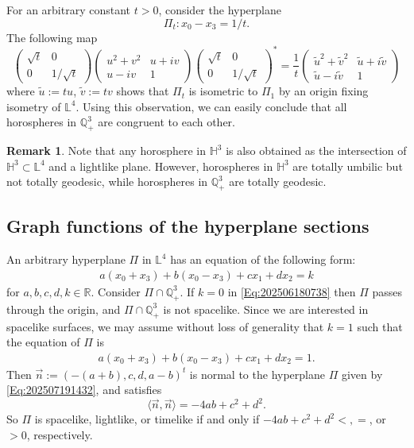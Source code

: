 \documentclass[12pt,reqno]{amsart}
\theoremstyle{plain} %
\theoremstyle{definition}
\newtheorem{remark}[theorem]{Remark}
\numberwithin{equation}{section}
\newcommand{\qthreep}{\mathbb{Q}^3_+}
\begin{document}
For an arbitrary constant $t>0$, consider the hyperplane
\begin{equation}\label{Eq:202601260727PM}
	\Pi_t : x_0 - x_3 = 1/t.
\end{equation}
The following map
$$
	\begin{pmatrix} \sqrt{t} & 0 \\ 0 & 1/\sqrt{t} \end{pmatrix}
	\begin{pmatrix} u^2 + v^2 & u + i v \\ u - i v & 1 \end{pmatrix}
	\begin{pmatrix} \sqrt{t} & 0 \\ 0 & 1/\sqrt{t} \end{pmatrix}^*
	= \frac{1}{t} \begin{pmatrix} \tilde{u}^2 + \tilde{v}^2 & \tilde{u} + i \tilde{v} \\ \tilde{u}  - i \tilde{v}  & 1 \end{pmatrix}
$$
where $\tilde{u} := t u$, $\tilde{v} := t v$ shows that $\Pi_t$ is isometric to $\Pi_1$ by an origin fixing isometry of $\mathbb{L}^4$.
Using this observation, we can easily conclude that all horospheres in $\qthreep$ are congruent to each other.


\begin{remark}
	Note that any horosphere in $\mathbb{H}^3$ is also obtained as the intersection of $\mathbb{H}^3 \subset \mathbb{L}^4$ and a lightlike plane.
	However, horospheres in $\mathbb{H}^3$ are totally umbilic but not totally geodesic, while horospheres in $\qthreep$ are totally geodesic.
\end{remark}

\subsection{Graph functions of the hyperplane sections}
An arbitrary hyperplane $\Pi$ in $\mathbb{L}^4$ has an equation of the following form:
\begin{align}\label{Eq:202506180738}
	a (x_0+x_3) + b(x_0-x_3) + cx_1 + d x_2 =  k
\end{align}
for $a,b,c,d,k\in\mathbb{R}$. Consider $\Pi \cap \qthreep$. If $k=0$ in \eqref{Eq:202506180738} then $\Pi$ passes through the origin, and $\Pi \cap \mathbb{Q}^3_+$ is not spacelike. Since we are interested in spacelike surfaces, we  may  assume without loss of generality that $k = 1$ such that
the equation of $\Pi$ is
\begin{align}\label{Eq:202507191432}
	a (x_0+x_3) + b(x_0-x_3) + cx_1 + d x_2 =  1.
\end{align}
Then  $\vec{n} := (-(a+b), c, d , a-b)^t$ is normal to  the hyperplane $\Pi$ given by \eqref{Eq:202507191432}, and satisfies
\[
	\langle \vec{n}, \vec{n}  \rangle  = - 4 ab + c^2 + d^2.
\]
So $\Pi$ is spacelike, lightlike, or timelike if and only if $- 4 ab + c^2 + d^2 <, =$, or $>0$, respectively.
\end{document}
